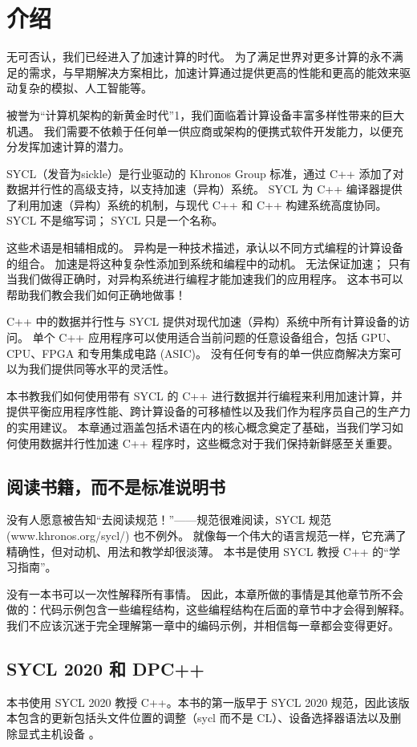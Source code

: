 \section{介绍}
无可否认，我们已经进入了加速计算的时代。 为了满足世界对更多计算的永不满足的需求，与早期解决方案相比，加速计算通过提供更高的性能和更高的能效来驱动复杂的模拟、人工智能等。

被誉为“计算机架构的新黄金时代”1，我们面临着计算设备丰富多样性带来的巨大机遇。 我们需要不依赖于任何单一供应商或架构的便携式软件开发能力，以便充分发挥加速计算的潜力。

SYCL（发音为sickle）是行业驱动的 Khronos Group 标准，通过 C++ 添加了对数据并行性的高级支持，以支持加速（异构）系统。 SYCL 为 C++ 编译器提供了利用加速（异构）系统的机制，与现代 C++ 和 C++ 构建系统高度协同。 SYCL 不是缩写词； SYCL 只是一个名称。

\begin{remark}[加速 vs 异构]
	这些术语是相辅相成的。 异构是一种技术描述，承认以不同方式编程的计算设备的组合。 加速是将这种复杂性添加到系统和编程中的动机。 无法保证加速； 只有当我们做得正确时，对异构系统进行编程才能加速我们的应用程序。 这本书可以帮助我们教会我们如何正确地做事！
\end{remark}

C++ 中的数据并行性与 SYCL 提供对现代加速（异构）系统中所有计算设备的访问。 单个 C++ 应用程序可以使用适合当前问题的任意设备组合，包括 GPU、CPU、FPGA 和专用集成电路 (ASIC)。 没有任何专有的单一供应商解决方案可以为我们提供同等水平的灵活性。

本书教我们如何使用带有 SYCL 的 C++ 进行数据并行编程来利用加速计算，并提供平衡应用程序性能、跨计算设备的可移植性以及我们作为程序员自己的生产力的实用建议。 本章通过涵盖包括术语在内的核心概念奠定了基础，当我们学习如何使用数据并行性加速 C++ 程序时，这些概念对于我们保持新鲜感至关重要。


\subsection{阅读书籍，而不是标准说明书}
没有人愿意被告知“去阅读规范！”——规范很难阅读，SYCL 规范 (www.khronos.org/sycl/) 也不例外。 就像每一个伟大的语言规范一样，它充满了精确性，但对动机、用法和教学却很淡薄。 本书是使用 SYCL 教授 C++ 的“学习指南”。

没有一本书可以一次性解释所有事情。 因此，本章所做的事情是其他章节所不会做的：代码示例包含一些编程结构，这些编程结构在后面的章节中才会得到解释。 我们不应该沉迷于完全理解第一章中的编码示例，并相信每一章都会变得更好。

\subsection{SYCL 2020 和 DPC++}
本书使用 SYCL 2020 教授 C++。本书的第一版早于 SYCL 2020 规范，因此该版本包含的更新包括头文件位置的调整（sycl 而不是 CL）、设备选择器语法以及删除显式主机设备 。


